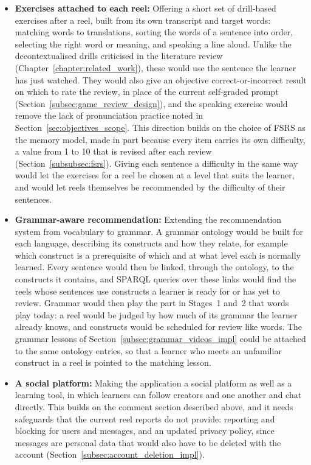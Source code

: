 \begin{sloppypar}
\begin{itemize}
        \item \textbf{Exercises attached to each reel:} Offering a short set of drill-based exercises after a reel, built from its own transcript and target words: matching words to translations, sorting the words of a sentence into order, selecting the right word or meaning, and speaking a line aloud. Unlike the decontextualised drills criticised in the literature review (Chapter~\ref{chapter:related_work}), these would use the sentence the learner has just watched. They would also give an objective correct-or-incorrect result on which to rate the review, in place of the current self-graded prompt (Section~\ref{subsec:game_review_design}), and the speaking exercise would remove the lack of pronunciation practice noted in Section~\ref{sec:objectives_scope}. This direction builds on the choice of FSRS as the memory model, made in part because every item carries its own difficulty, a value from 1 to 10 that is revised after each review (Section~\ref{subsubsec:fsrs}). Giving each sentence a difficulty in the same way would let the exercises for a reel be chosen at a level that suits the learner, and would let reels themselves be recommended by the difficulty of their sentences.
        \item \textbf{Grammar-aware recommendation:} Extending the recommendation system from vocabulary to grammar. A grammar ontology would be built for each language, describing its constructs and how they relate, for example which construct is a prerequisite of which and at what level each is normally learned. Every sentence would then be linked, through the ontology, to the constructs it contains, and SPARQL queries over these links would find the reels whose sentences use constructs a learner is ready for or has yet to review. Grammar would then play the part in Stages~1 and~2 that words play today: a reel would be judged by how much of its grammar the learner already knows, and constructs would be scheduled for review like words. The grammar lessons of Section~\ref{subsec:grammar_videos_impl} could be attached to the same ontology entries, so that a learner who meets an unfamiliar construct in a reel is pointed to the matching lesson.
        \item \textbf{A social platform:} Making the application a social platform as well as a learning tool, in which learners can follow creators and one another and chat directly. This builds on the comment section described above, and it needs safeguards that the current reel reports do not provide: reporting and blocking for users and messages, and an updated privacy policy, since messages are personal data that would also have to be deleted with the account (Section~\ref{subsec:account_deletion_impl}).

\end{itemize}
\end{sloppypar}
